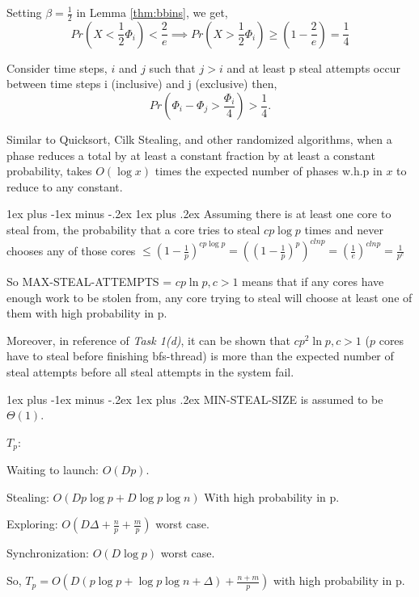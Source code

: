 \documentclass[11pt]{article}
\makeatletter
\renewcommand{\subsection}{\@startsection{subsection}{2}{0mm}%
                                     {1ex plus -1ex minus -.2ex}%
                                     {1ex plus .2ex}%
                                     {\normalfont\large\bfseries}}%
\makeatother
\begin{document}
Setting $\beta = \frac {1}{2}$ in Lemma \ref{thm:bbins}, we get,
\[
Pr \left( X < \frac{1}{2} \Phi_i \right) < \frac {2}{e} \implies Pr \left( X > \frac{1}{2} \Phi_i \right) \ge \left( 1 - \frac {2}{e} \right) = \frac {1}{4}
\]

Consider time steps, $i$ and $j$ such that $j > i$ and at least p steal attempts occur between time steps i (inclusive) and j (exclusive) then,
\[
    Pr \left( \Phi_i - \Phi_j > \frac{\Phi_i}{4}\right)  > \frac {1}{4}.
\]

Similar to Quicksort, Cilk Stealing, and other randomized algorithms, when a phase reduces a total by at least a constant fraction by at least a constant probability,
takes $O(\log x)$ times the expected number of phases w.h.p in $x$ to reduce to any constant.




\subsection{}
Assuming there is at least one core to steal from, the probability that a core
tries to steal $cp\log p$ times and never chooses any of those cores $\le {(1-\frac{1}{p})}^{cp \log p} = {({(1-\frac{1}{p})}^p)}^{clnp} = {(\frac{1}{e})}^{clnp} = \frac{1}{p^c}$

So MAX-STEAL-ATTEMPTS = $cp\ln p, c>1$ means that if any cores have enough work to be stolen from,
any core trying to steal will choose at least one of them with high probability in p.

Moreover, in reference of {\it Task 1(d)}, it can be shown that  $cp^2 \ln p, c>1$ ($p$ cores have to steal before finishing bfs-thread)
is more than the expected number of steal attempts before all steal attempts in the system fail.

\subsection{}
MIN-STEAL-SIZE is assumed to be $\Theta(1)$.

$T_p$:

Waiting to launch: $O(Dp)$.

Stealing: $O(D p \log p + D \log p \log n)$ With high probability in p.

Exploring: $O(D \Delta  + \frac{n}{p} + \frac{m}{p})$ worst case.

Synchronization: $O(D \log p)$ worst case.

So, $T_p = O( D(p \log p + \log p \log n + \Delta) + \frac{n+m}{p})$ with high probability in p.
\end{document}
